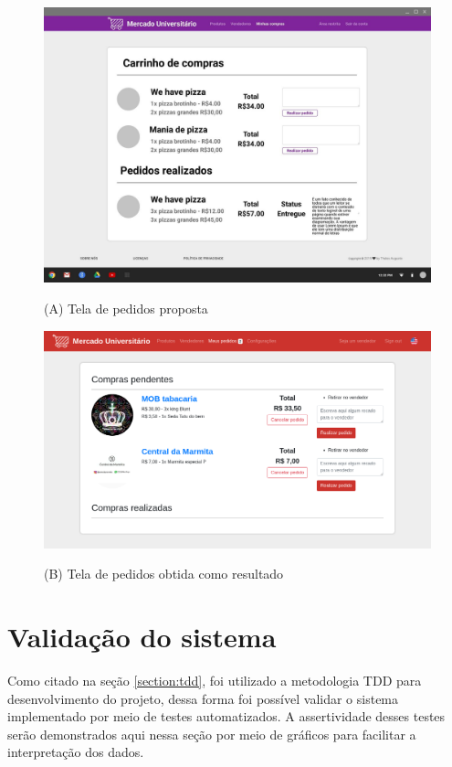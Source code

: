 \begin{figure}[htbp!]
  \centering
  \caption{(A) Tela de pedidos proposta}
  \includegraphics[width=1\textwidth]{figs/mockup/carrinho.jpg}
    \label{fig:mockup_pedidos}
\end{figure}

\begin{figure}[htbp!]
  \centering
  \caption{(B) Tela de pedidos obtida como resultado}
  \includegraphics[width=1\textwidth]{figs/resultado/carrinho.png}
    \label{fig:real_pedidos}
\end{figure}

\section{Validação do sistema}

Como citado na seção \ref{section:tdd}, foi utilizado a metodologia TDD para desenvolvimento do projeto, dessa forma foi possível validar o sistema implementado por meio de testes automatizados. A assertividade desses testes serão demonstrados aqui nessa seção por meio de gráficos para facilitar a interpretação dos dados. 

